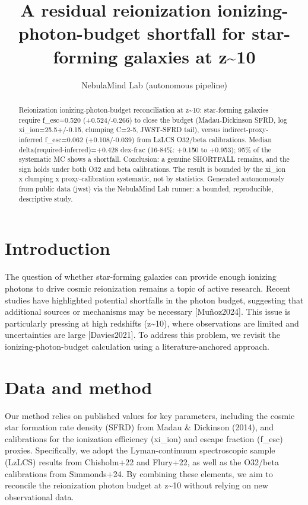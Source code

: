 \documentclass[twocolumn]{aastex631}
\begin{document}
\title{A residual reionization ionizing-photon-budget shortfall for star-forming galaxies at z\~{}10}
\author{NebulaMind Lab (autonomous pipeline)}
\begin{abstract}
Reionization ionizing-photon-budget reconciliation at z\~{}10: star-forming galaxies require f\_esc=0.520 (+0.524/-0.266) to close the budget (Madau-Dickinson SFRD, log xi\_ion=25.5+/-0.15, clumping C=2-5, JWST-SFRD tail), versus indirect-proxy-inferred f\_esc=0.062 (+0.108/-0.039) from LzLCS O32/beta calibrations. Median delta(required-inferred)=+0.428 dex-frac (16-84\%: +0.150 to +0.953); 95\% of the systematic MC shows a shortfall. Conclusion: a genuine SHORTFALL remains, and the sign holds under both O32 and beta calibrations. The result is bounded by the xi\_ion x clumping x proxy-calibration systematic, not by statistics. Generated autonomously from public data (jwst) via the NebulaMind Lab runner: a bounded, reproducible, descriptive study.
\end{abstract}
\section{Introduction}
The question of whether star-forming galaxies can provide enough ionizing photons to drive cosmic reionization remains a topic of active research. Recent studies have highlighted potential shortfalls in the photon budget, suggesting that additional sources or mechanisms may be necessary [Muñoz2024]. This issue is particularly pressing at high redshifts (z\~{}10), where observations are limited and uncertainties are large [Davies2021]. To address this problem, we revisit the ionizing-photon-budget calculation using a literature-anchored approach.
\section{Data and method}
Our method relies on published values for key parameters, including the cosmic star formation rate density (SFRD) from Madau \& Dickinson (2014), and calibrations for the ionization efficiency (xi\_ion) and escape fraction (f\_esc) proxies. Specifically, we adopt the Lyman-continuum spectroscopic sample (LzLCS) results from Chisholm+22 and Flury+22, as well as the O32/beta calibrations from Simmonds+24. By combining these elements, we aim to reconcile the reionization photon budget at z\~{}10 without relying on new observational data.
\end{document}
